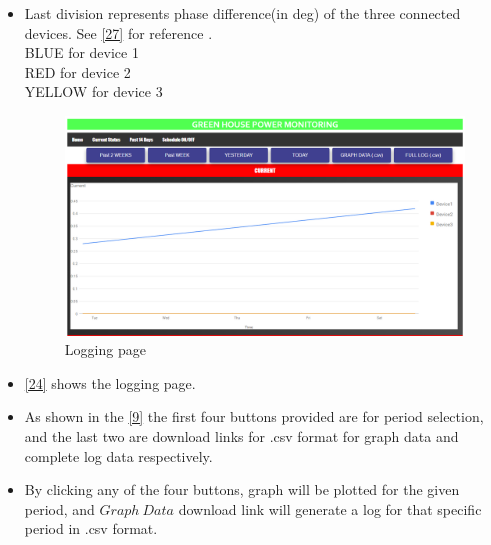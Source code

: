 \documentclass[a4paper,12pt,oneside]{book}
\begin{document}
\begin{itemize}
	\item{Last division represents phase difference(in deg) of the three connected devices. See  \autoref{27} for reference .\\BLUE for device 1\\RED for device 2\\YELLOW for device 3 } 
	
	\begin{figure}[H]
		\centering
		\includegraphics[width=15cm]{logging_page.png}
		\caption{Logging page}
		\label{24}
	\end{figure}
	
	
	\item{\autoref{24} shows the logging page.}
	\item{As shown in the \autoref{9} the first four buttons provided are for period selection, and the last two are download links for .csv format for graph data and complete log data respectively.   }
	
	\item{By clicking any of the four buttons, graph will be plotted for the given period, and $Graph\ Data$ download link will generate a log for that specific period in .csv format.}
	

\end{itemize}
\end{document}
